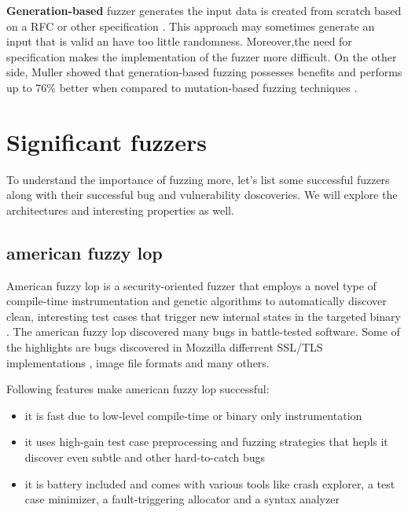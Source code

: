 \textbf{Generation-based} fuzzer generates the input data is created from scratch based on a RFC or other specification \cite{miller2007analysis}. This approach may sometimes generate an input that is valid an have too little randomness. Moreover,the need for specification makes the implementation of the fuzzer more difficult. On the other side, Muller showed that generation-based fuzzing possesses benefits and performs up to 76\% better when compared to mutation-based fuzzing techniques \cite{miller2007analysis}.


\section{Significant fuzzers}
\label{ssub:Significant fuzzers}
To understand the importance of fuzzing more, let's list some successful fuzzers along with their successful bug and vulnerability doscoveries. We will explore the architectures and interesting properties as well.

\subsection{american fuzzy lop}
American fuzzy lop is a security-oriented fuzzer that employs a novel type of compile-time instrumentation and genetic algorithms to automatically discover clean, interesting test cases that trigger new internal states in the targeted binary \cite{zalewski2018american}. The american fuzzy lop discovered many bugs in battle-tested software. Some of the highlights are bugs discovered in Mozzilla \cite{zalewski2014uninitialized, zalewski2014two, zalewski2015uninitialized, mozzilla2015update} differrent SSL/TLS implementations \cite{bock2015out, sharma2014gnutls}, image file formats \cite{zalewski2013ijg, cunningham2014segv} and many others.

Following features make american fuzzy lop successful:
\begin{itemize}
    \item it is fast due to low-level compile-time or binary only instrumentation
    \item it uses high-gain test case preprocessing and fuzzing strategies that hepls it discover even subtle and other hard-to-catch bugs
    \item it is battery included and comes with various tools like crash explorer, a test case minimizer, a fault-triggering allocator and a syntax analyzer
\end{itemize}

